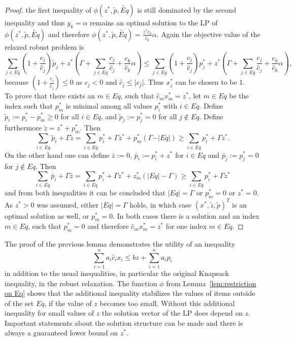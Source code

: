 \documentclass[titlepage, a4paper]{amsbook}
\theoremstyle{plain}
\theoremstyle{break}
\theoremstyle{definition}
\theoremstyle{remark}
\numberwithin{equation}{thm}
\begin{document}
\begin{proof}
the first inequality of 
$\phi(z^*, \tilde{p}, \widetilde{Eq})$ is still dominated by the second inequality and thus $y_k=\alpha$ remains an optimal solution to the LP of $\phi(z^*, \tilde{p}, \widetilde{Eq})$ and therefore $\phi(z^*, \tilde{p}, \widetilde{Eq})=\frac{z^*c_k}{\hat{c}_k}\alpha$. Again the objective value of the relaxed robust problem is
\[\sum_{j \in Eq} (1+\frac{c_j}{\hat{c}_j})\tilde{p}_j + z^*(\Gamma + \sum_{j \in Eq}\frac{c_j}{\hat{c}_j} + \frac{c_k}{\hat{c}_k}\alpha) \leq \sum_{j \in Eq} (1+\frac{c_j}{\hat{c}_j})p^*_j + z^*(\Gamma + \sum_{j \in Eq}\frac{c_j}{\hat{c}_j} + \frac{c_k}{\hat{c}_k}\alpha),\]
because $(1+\frac{c_j}{\hat{c}_j}) \leq 0$ as $c_j < 0$ and $\hat{c}_j \leq \vert c_j \vert$. Thus $x^*_j$ can be chosen to be $1$. \\
To prove that there exists an $m \in Eq$, such that $\hat{c}_mx^*_m=z^*$, let $m \in Eq$ be the index such that $p^*_m$ is minimal among all values $p^*_i$ with $i \in Eq$. Define $\tilde{p}_i:=p^*_i-p^*_m \geq 0$ for all $i \in Eq$, and $\tilde{p}_j:=p^*_j=0$ for all $j \notin Eq$. Define furthermore $\tilde{z}=z^*+p^*_m$. Then 
\[\sum_{i \in Eq}\tilde{p}_i + \Gamma \tilde{z} = \sum_{i \in Eq}p^*_i + \Gamma z^* + p^*_m (\Gamma -\vert Eq \vert) \geq \sum_{i \in Eq}p^*_i + \Gamma z^*.\]
On the other hand one can define $\bar{z}:=0$, $\bar{p}_i:=p^*_i + z^*$ for $i \in Eq$ and $\bar{p}_j:=p^*_j=0$ for $j \notin Eq$. Then
\[\sum_{i \in Eq}\bar{p}_i + \Gamma \bar{z} = \sum_{i \in Eq}p^*_i + \Gamma z^* + z^*_m (\vert Eq \vert - \Gamma) \geq \sum_{i \in Eq}p^*_i + \Gamma z^*\]
and from both inequalities it can be concluded that $\vert Eq \vert = \Gamma$ or $p^*_m=0$ or $z^*=0$. As $z^* > 0$ was assumed, either
$\vert Eq \vert = \Gamma$ holds, in which case $(x^*, \tilde{z}, \tilde{p})^T$ is an optimal solution as well, or $p^*_m=0$. In both cases there is a solution and an index $m \in Eq$, such that $p^*_m=0$ and therefore $\hat{c}_m x^*_m= z^*$ for one index $m \in Eq$.
\end{proof}
The proof of the previous lemma demonstrates the utility of an inequality 
\[\sum_{i=1}^n a_i \hat{c}_i x_i \leq bz + \sum_{i=1}^n a_i p_i\]
in addition to the usual inequalities, in particular the original Knapsack inequality, in the robust relaxation. The function $\phi$ from Lemma~\ref{lem:restriction on Eq} shows that the additional inequality stabilizes the values of items outside of the set $Eq$, if the value of $z$ becomes too small. Without this additional inequality for small values of $z$ the solution vector of the LP does depend on $z$. Important statements about the solution structure can be made and there is always a guaranteed lower bound on $z^*$.
\end{document}
